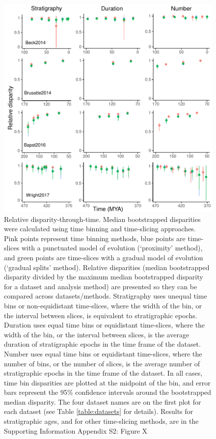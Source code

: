 \documentclass[12pt,a4paper]{article}
\begin{document}
  \begin{figure}[!htbp]
    \centering
    \includegraphics[width=1\linewidth, height=1\textheight, keepaspectratio]{figures/fig-dtt-epoch.pdf}
    \caption[Relative disparity-through-time.]
    {Relative disparity-through-time. Median bootstrapped disparities were calculated using time binning and time-slicing approaches. 
    Pink points represent time binning methods, blue points are time-slices with a punctuated model of evolution (`proximity' method), and green points are time-slices with a gradual model of evolution (`gradual splits' method).
    Relative disparities (median bootstrapped disparity divided by the maximum median bootstrapped disparity for a dataset and analysis method) are presented so they can be compared across datasets/methods. 
    Stratigraphy uses unequal time bins or non-equidistant time-slices, where the width of the bin, or the interval between slices, is equivalent to stratigraphic epochs. 
    Duration uses equal time bins or equidistant time-slices, where the width of the bin, or the interval between slices, is the average duration of stratigraphic epochs in the time frame of the dataset. 
    Number uses equal time bins or equidistant time-slices, where the number of bins, or the number of slices, is the average number of stratigraphic epochs in the time frame of the dataset. 
    In all cases, time bin disparities are plotted at the midpoint of the bin, and error bars represent the 95\% confidence intervals around the bootstrapped median disparity.
    The four dataset names are on the first plot for each dataset (see Table \ref{table:datasets} for details).
    Results for stratigraphic ages, and for other time-slicing methods, are in the Supporting Information Appendix S2: Figure X} %
    \label{figure:dtt1}
  \end{figure}
\end{document}
